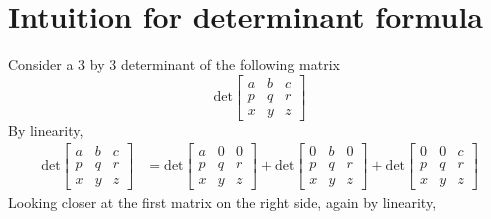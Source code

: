 \documentclass{report}
\begin{document}
\section{Intuition for determinant formula}
Consider a 3 by 3 determinant of the following matrix
\begin{equation*}
\text{det}\left[\begin{array}{ccc}
a&b&c\\
p&q&r\\
x&y&z
\end{array}\right]
\end{equation*}
By linearity,
\begin{align*}
\text{det}\left[\begin{array}{ccc}
a&b&c\\
p&q&r\\
x&y&z
\end{array}\right]&
=\text{det}\left[\begin{array}{ccc}
a&0&0\\
p&q&r\\
x&y&z
\end{array}\right]+
\text{det}\left[\begin{array}{ccc}
0&b&0\\
p&q&r\\
x&y&z
\end{array}\right]+
\text{det}\left[\begin{array}{ccc}
0&0&c\\
p&q&r\\
x&y&z
\end{array}\right]
\end{align*}
Looking closer at the first matrix on the right side, again by linearity,
\end{document}
